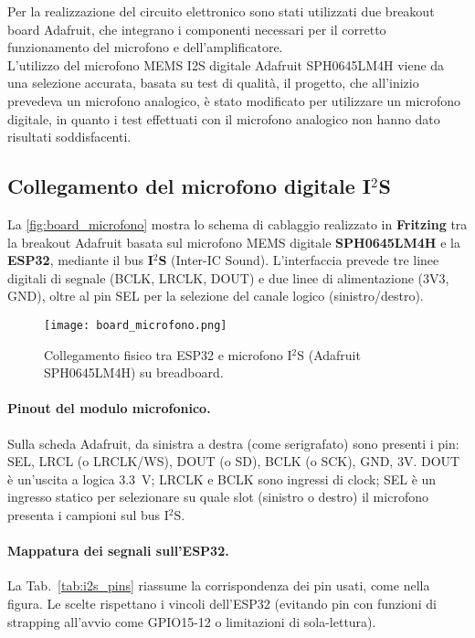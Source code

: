 Per la realizzazione del circuito elettronico sono stati utilizzati due breakout board Adafruit, che integrano i componenti necessari per il corretto funzionamento
  del microfono e dell'amplificatore.\\
  L'utilizzo del microfono MEMS I2S digitale Adafruit SPH0645LM4H viene da una selezione accurata, basata su test di qualità,
  il progetto, che all'inizio prevedeva un microfono analogico, è stato modificato per utilizzare un microfono digitale,
  in quanto i test effettuati con il microfono analogico non hanno dato risultati soddisfacenti.\\



  \subsection{Collegamento del microfono digitale I$^2$S}
  \label{subsec:conn_mic}
  
  La \autoref{fig:board_microfono} mostra lo schema di cablaggio realizzato in \textbf{Fritzing} tra la breakout Adafruit basata sul microfono MEMS digitale \textbf{SPH0645LM4H} e la \textbf{ESP32}, mediante il bus \textbf{I$^2$S} (Inter-IC Sound). L’interfaccia prevede tre linee digitali di segnale
  (BCLK, LRCLK, DOUT) e due linee di alimentazione (3V3, GND), oltre al pin SEL per la selezione del canale logico (sinistro/destro).
  
  \begin{figure}[H]
    \centering
    \texttt{[image: board\_microfono.png]}
    \caption{Collegamento fisico tra ESP32 e microfono I$^2$S (Adafruit SPH0645LM4H) su breadboard.}
    \label{fig:board_microfono}
  \end{figure} 

  \paragraph{Pinout del modulo microfonico.}
  Sulla scheda Adafruit, da sinistra a destra (come serigrafato) sono presenti i pin: SEL, LRCL (o LRCLK/WS), DOUT (o SD), BCLK (o SCK), GND, 3V.  
  DOUT è un’uscita a logica \SI{3.3}{\volt}; LRCLK e BCLK sono ingressi di clock; SEL è un ingresso statico per selezionare su quale slot (sinistro o destro) il microfono presenta i campioni sul bus I$^2$S.
  
  \paragraph{Mappatura dei segnali sull'ESP32.}
  La Tab.~\ref{tab:i2s_pins} riassume la corrispondenza dei pin usati, come nella figura. Le scelte rispettano i vincoli dell'ESP32 (evitando pin con funzioni di strapping all'avvio come GPIO15-12 o limitazioni di sola-lettura).
  
